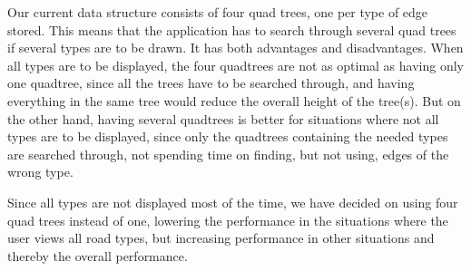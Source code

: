 Our current data structure consists of four quad trees, one per type of edge stored. This means that the application has to search through several quad trees if several types are to be drawn. It has both advantages and disadvantages. When all types are to be displayed, the four quadtrees are not as optimal as having only one quadtree, since all the trees have to be searched through, and having everything in the same tree would reduce the overall height of the tree(s). But on the other hand, having several quadtrees is better for situations where not all types are to be displayed, since only the quadtrees containing the needed types are searched through, not spending time on finding, but not using, edges of the wrong type.

Since all types are not displayed most of the time, we have decided on using four quad trees instead of one, lowering the performance in the situations where the user views all road types, but increasing performance in other situations and thereby the overall performance.